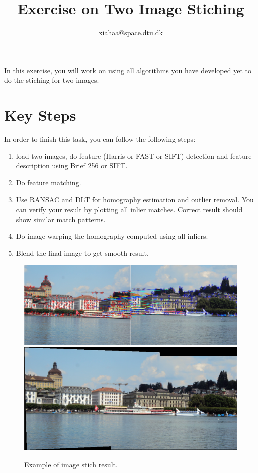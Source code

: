 \documentclass[a4paper]{article}
\begin{document}
\title{Exercise on Two Image Stiching}
\author{xiahaa@space.dtu.dk}
\maketitle%

In this exercise, you will work on using all algorithms you have developed yet to do the stiching for two images.

\section{Key Steps}
In order to finish this task, you can follow the following steps:
\begin{enumerate}
\item load two images, do feature (Harris or FAST or SIFT) detection and feature description using Brief 256 or SIFT.
\item Do feature matching. 
\item Use RANSAC and DLT for homography estimation and outlier removal. You can verify your result by plotting all inlier matches. Correct result should show similar match patterns.
\item Do image warping the homography computed using all inliers.
\item Blend the final image to get smooth result.
\end{enumerate}


\begin{figure}[!b]
	\centering
	\includegraphics[scale=0.5]{figures/inlier_matches.png}
	\includegraphics[scale=0.5]{figures/stcih_blend.png}
	\caption{Example of image stich result.}
\end{figure}
\end{document}
